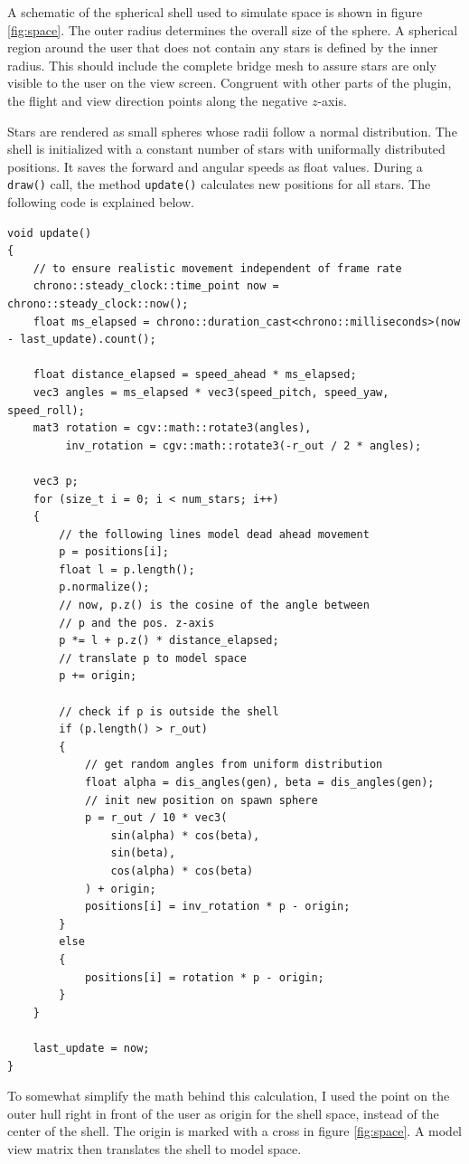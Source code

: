 \documentclass[hyperref, bachelorofscience]{cgvpub}
\begin{document}
A schematic of the spherical shell used to simulate space is shown in figure \ref{fig:space}. The outer radius determines the overall size of the sphere. A spherical region around the user that does not contain any stars is defined by the inner radius. This should include the complete bridge mesh to assure stars are only visible to the user on the view screen. Congruent with other parts of the plugin, the flight and view direction points along the negative $ z $-axis. 

Stars are rendered as small spheres whose radii follow a normal distribution. The shell is initialized with a constant number of stars with uniformally distributed positions. It saves the forward and angular speeds as float values. During a \lstinline|draw()| call, the method \lstinline|update()| calculates new positions for all stars. The following code is explained below.

\begin{lstlisting}
void update()
{
	// to ensure realistic movement independent of frame rate
	chrono::steady_clock::time_point now = chrono::steady_clock::now();
	float ms_elapsed = chrono::duration_cast<chrono::milliseconds>(now - last_update).count();
	
	float distance_elapsed = speed_ahead * ms_elapsed;
	vec3 angles = ms_elapsed * vec3(speed_pitch, speed_yaw, speed_roll);
	mat3 rotation = cgv::math::rotate3(angles),
	     inv_rotation = cgv::math::rotate3(-r_out / 2 * angles);
	
	vec3 p;
	for (size_t i = 0; i < num_stars; i++)
	{
		// the following lines model dead ahead movement
		p = positions[i];
		float l = p.length();
		p.normalize();
		// now, p.z() is the cosine of the angle between
		// p and the pos. z-axis
		p *= l + p.z() * distance_elapsed;
		// translate p to model space
		p += origin;
		
		// check if p is outside the shell
		if (p.length() > r_out)
		{
			// get random angles from uniform distribution
			float alpha = dis_angles(gen), beta = dis_angles(gen);
			// init new position on spawn sphere
			p = r_out / 10 * vec3(
				sin(alpha) * cos(beta),
				sin(beta),
				cos(alpha) * cos(beta)
			) + origin;
			positions[i] = inv_rotation * p - origin;
		}
		else
		{
			positions[i] = rotation * p - origin;
		}
	}

	last_update = now;
}
\end{lstlisting}

To somewhat simplify the math behind this calculation, I used the point on the outer hull right in front of the user as origin for the shell space, instead of the center of the shell. The origin is marked with a cross in figure \ref{fig:space}. A model view matrix then translates the shell to model space. 
\end{document}
